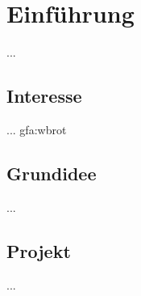 %
%


\chapter{Einführung}
\label{Einführung}

...
\\



\section{Interesse}

... \gls{gfa:wbrot}
\\



\section{Grundidee}

...
\\



\section{Projekt}

...
\\

